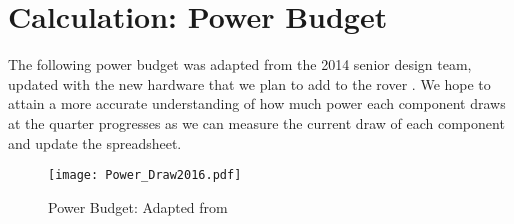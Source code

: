 \chapter{Calculation: Power Budget} \label{App:PowerBudget}

The following power budget was adapted from the 2014 senior design team, updated with the new hardware that we plan to add to the rover \cite{rslrover2014}. We hope to attain a more accurate understanding of how much power each component draws at the quarter progresses as we can measure the current draw of each component and update the spreadsheet.

\begin{figure}[H]
\centerline{\texttt{[image: Power\_Draw2016.pdf]}}
\caption[]{Power Budget: Adapted from \cite{rslrover2014}}
\label{fig:PowerBudget}
\end{figure}
